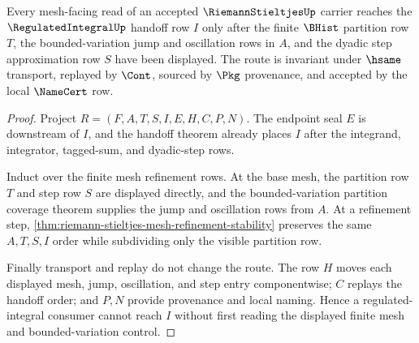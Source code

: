 \begin{theorem}
\label{thm:riemann-stieltjes-regulated-integral-mesh-handoff}
Every mesh-facing read of an accepted $\RiemannStieltjesUp$ carrier reaches the $\RegulatedIntegralUp$ handoff row $I$ only after the finite $\BHist$ partition row $T$, the bounded-variation jump and oscillation rows in $A$, and the dyadic step approximation row $S$ have been displayed. The route is invariant under $\hsame$ transport, replayed by $\Cont$, sourced by $\Pkg$ provenance, and accepted by the local $\NameCert$ row.
\end{theorem}
\begin{proof}
Project $R=(F,A,T,S,I,E,H,C,P,N)$. The endpoint seal $E$ is downstream of $I$, and the handoff theorem already places $I$ after the integrand, integrator, tagged-sum, and dyadic-step rows.

Induct over the finite mesh refinement rows. At the base mesh, the partition row $T$ and step row $S$ are displayed directly, and the bounded-variation partition coverage theorem supplies the jump and oscillation rows from $A$. At a refinement step, \autoref{thm:riemann-stieltjes-mesh-refinement-stability} preserves the same $A,T,S,I$ order while subdividing only the visible partition row.

Finally transport and replay do not change the route. The row $H$ moves each displayed mesh, jump, oscillation, and step entry componentwise; $C$ replays the handoff order; and $P,N$ provide provenance and local naming. Hence a regulated-integral consumer cannot reach $I$ without first reading the displayed finite mesh and bounded-variation control.
\end{proof}

